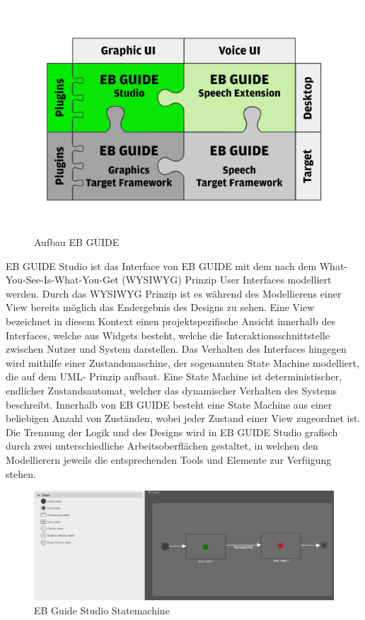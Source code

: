 \begin{figure} [H]
\begin{center}
  \includegraphics[scale=0.6]{figures/EB_GUIDE_Puzzle.png}
  \caption{Aufbau EB GUIDE}
  \label{fig:guide_puzzle}
\end{center}
\end{figure}

EB GUIDE Studio ist das Interface von EB GUIDE mit dem nach dem What-You-See-Is-What-You-Get (WYSIWYG) Prinzip User Interfaces modelliert werden. 
Durch das WYSIWYG Prinzip ist es während des Modellierens einer View bereits möglich das Endergebnis des Designs zu sehen.
Eine View bezeichnet in diesem Kontext einen projektspezifische Ansicht innerhalb des Interfaces, welche aus Widgets besteht, welche die Interaktionsschnittstelle zwischen Nutzer und System darstellen.
Das Verhalten des Interfaces hingegen wird mithilfe einer Zustandsmaschine, der sogenannten State Machine modelliert, die auf dem UML- Prinzip aufbaut.
Eine State Machine ist deterministischer, endlicher Zustandsautomat, welcher das dynamischer Verhalten des Systems beschreibt.
Innerhalb von EB GUIDE besteht eine State Machine aus einer beliebigen Anzahl von Zuständen, wobei jeder Zustand einer View zugeordnet ist.
Die Trennung der Logik und des Designs wird in EB GUIDE Studio grafisch durch zwei unterschiedliche Arbeitsoberflächen gestaltet, in welchen den Modellierern jeweils die entsprechenden Tools und Elemente zur Verfügung stehen.

\begin{figure} [H]
\begin{center}
  \includegraphics[scale=0.4]{figures/Guide_Statemachine.PNG}
  \caption{EB Guide Studio Statemachine}
  \label{fig:Guide_Statemachine}
\end{center}
\end{figure}

